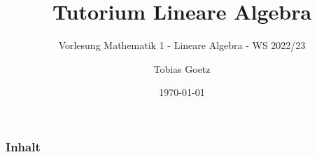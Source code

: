 \documentclass[11pt]{beamer}
\title[Tutorium Lineare Algebra]{Tutorium Lineare Algebra}
\subtitle{Vorlesung Mathematik 1 - Lineare Algebra - WS 2022/23}
\author{Tobias Goetz}
\institute{DHBW Ravensburg}
\date{\today}
\begin{document}
    \begin{frame}
        \titlepage
    \end{frame}

    \begin{frame}
        \frametitle{Inhalt}
        \tableofcontents
    \end{frame}

    
\end{document}
